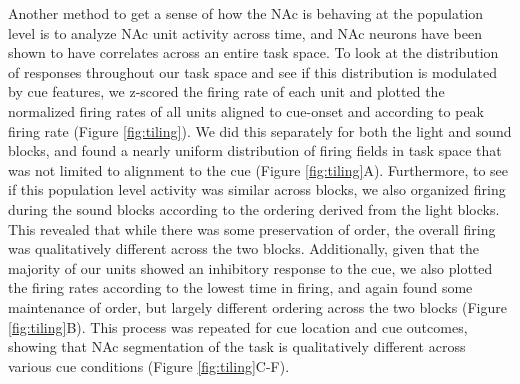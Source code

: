 \documentclass[11pt]{article}
\begin{document}
Another method to get a sense of how the NAc is behaving at the population level is to analyze NAc unit activity across time, and NAc neurons have been shown to have correlates across an entire task space. To look at the distribution of responses throughout our task space and see if this distribution is modulated by cue features, we z-scored the firing rate of each unit and plotted the normalized firing rates of all units aligned to cue-onset and according to peak firing rate (Figure \ref{fig:tiling}). We did this separately for both the light and sound blocks, and found a nearly uniform distribution of firing fields in task space that was not limited to alignment to the cue (Figure \ref{fig:tiling}A). Furthermore, to see if this population level activity was similar across blocks, we also organized firing during the sound blocks according to the ordering derived from the light blocks. This revealed that while there was some preservation of order, the overall firing was qualitatively different across the two blocks. Additionally, given that the majority of our units showed an inhibitory response to the cue, we also plotted the firing rates according to the lowest time in firing, and again found some maintenance of order, but largely different ordering across the two blocks (Figure \ref{fig:tiling}B). This process was repeated for cue location and cue outcomes, showing that NAc segmentation of the task is qualitatively different across various cue conditions  (Figure \ref{fig:tiling}C-F). 
\end{document}
